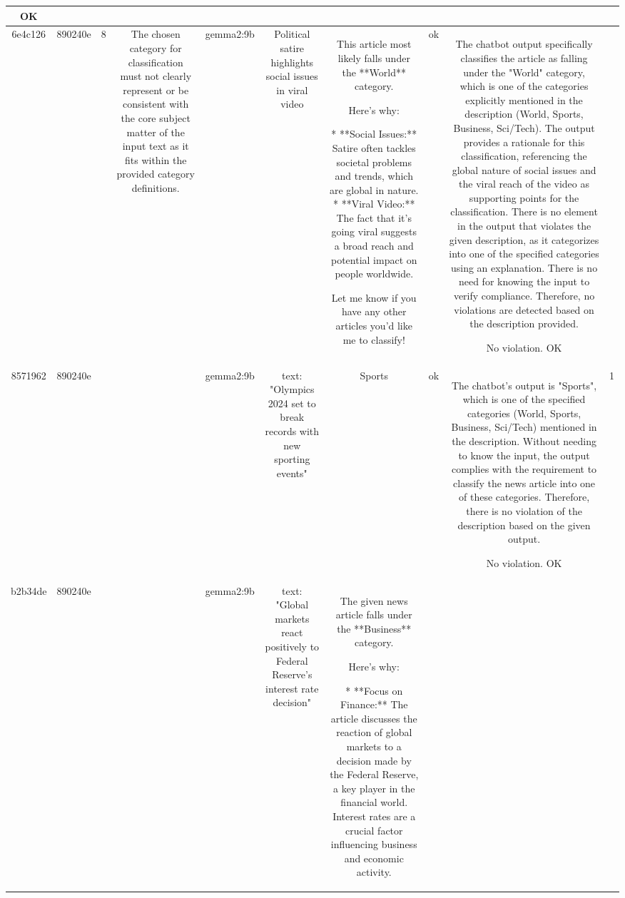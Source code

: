 \begin{table}[h!]
\begin{tabular}{|c|c|c|c|c|c|c|c|c|c|}
OK & \\
\hline
6e4c126 & 890240e & 8 & The chosen category for classification must not clearly represent or be consistent with the core subject matter of the input text as it fits within the provided category definitions. & gemma2:9b & Political satire highlights social issues in viral video & This article most likely falls under the **World** category. 

Here's why:

* **Social Issues:**  Satire often tackles societal problems and trends, which are global in nature. 
* **Viral Video:** The fact that it's going viral suggests a broad reach and potential impact on people worldwide.


Let me know if you have any other articles you'd like me to classify! 
 & ok & The chatbot output specifically classifies the article as falling under the "World" category, which is one of the categories explicitly mentioned in the description (World, Sports, Business, Sci/Tech). The output provides a rationale for this classification, referencing the global nature of social issues and the viral reach of the video as supporting points for the classification. There is no element in the output that violates the given description, as it categorizes into one of the specified categories using an explanation. There is no need for knowing the input to verify compliance. Therefore, no violations are detected based on the description provided.

No violation.
OK & \\
\hline
8571962 & 890240e &  &  & gemma2:9b & text: "Olympics 2024 set to break records with new sporting events" & Sports  
 & ok & The chatbot's output is "Sports", which is one of the specified categories (World, Sports, Business, Sci/Tech) mentioned in the description. Without needing to know the input, the output complies with the requirement to classify the news article into one of these categories. Therefore, there is no violation of the description based on the given output.

No violation.
OK & 1\\
\hline
b2b34de & 890240e &  &  & gemma2:9b & text: "Global markets react positively to Federal Reserve's interest rate decision" & The given news article falls under the **Business** category. 

Here's why:

* **Focus on Finance:** The article discusses the reaction of global markets to a decision made by the Federal Reserve, a key player in the financial world. Interest rates are a crucial factor influencing business and economic activity.



\end{tabular}
\end{table}
